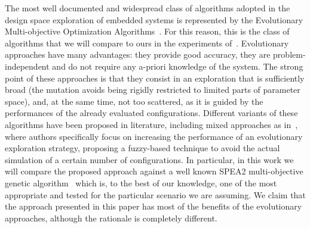 The most well documented and widespread class of algorithms adopted in the
design space exploration of embedded systems is represented by the Evolutionary
Multi-objective Optimization Algorithms~\cite{coello_easmop}. For this
reason, this is the class of algorithms that we will compare to ours in the experiments of~.
Evolutionary approaches have many advantages: they provide good accuracy, they are
problem-independent and do not require any a-priori knowledge of the
system. The strong point of these approaches is that they consist in an exploration that is sufficiently broad
(the mutation avoids being rigidly restricted to limited parts of
parameter space), and, at the same time, not too scattered, as it is
guided by the performances of the already evaluated configurations.
Different variants of these algorithms have been proposed in
literature, including mixed approaches as in~\cite{Ascia2011382},
where authors specifically focus on increasing the performance of an
evolutionary exploration strategy, proposing a fuzzy-based technique
to avoid the actual simulation of a certain number of configurations.
In particular, in this work we will compare the proposed approach against a
well known SPEA2 multi-objective genetic algorithm~\cite{knowles_techrep06}
which is, to the best of our knowledge, one of the most appropriate and
tested for the particular scenario we are assuming.  We
claim that the approach presented in this paper has most of the
benefits of the evolutionary approaches, although the rationale is
completely different.
